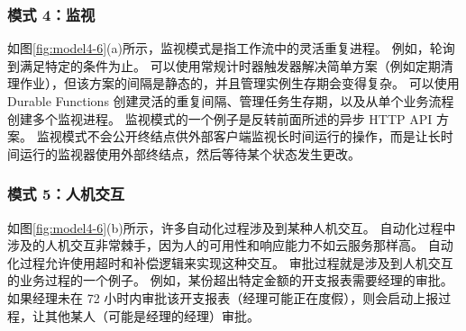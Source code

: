 \documentclass[11pt]{article}
\begin{document}
\subsubsection{模式 4：监视}
如图\ref{fig:model4-6}(a)所示，监视模式是指工作流中的灵活重复进程。 例如，轮询到满足特定的条件为止。 可以使用常规计时器触发器解决简单方案（例如定期清理作业），但该方案的间隔是静态的，并且管理实例生存期会变得复杂。 可以使用 Durable Functions 创建灵活的重复间隔、管理任务生存期，以及从单个业务流程创建多个监视进程。
监视模式的一个例子是反转前面所述的异步 HTTP API 方案。 监视模式不会公开终结点供外部客户端监视长时间运行的操作，而是让长时间运行的监视器使用外部终结点，然后等待某个状态发生更改。

\subsubsection{模式 5：人机交互}
如图\ref{fig:model4-6}(b)所示，许多自动化过程涉及到某种人机交互。 自动化过程中涉及的人机交互非常棘手，因为人的可用性和响应能力不如云服务那样高。 自动化过程允许使用超时和补偿逻辑来实现这种交互。
审批过程就是涉及到人机交互的业务过程的一个例子。 例如，某份超出特定金额的开支报表需要经理的审批。 如果经理未在 72 小时内审批该开支报表（经理可能正在度假），则会启动上报过程，让其他某人（可能是经理的经理）审批。
\end{document}
